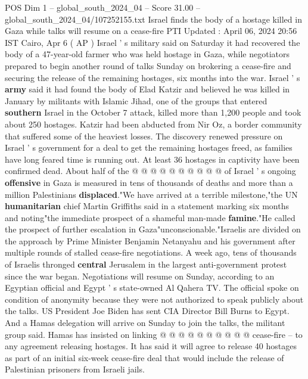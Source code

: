 \begin{textsample}{POS Dim 1 – global\_south\_2024\_04 – Score 31.00 – global\_south\_2024\_04/107252155.txt}  \label{ex:f1_pos_147}
Israel finds the body of a hostage killed in Gaza while talks will resume on a cease-fire PTI Updated : April 06, 2024 20:56 IST Cairo, Apr 6 ( AP ) Israel ' s military said on Saturday it had recovered the body of a 47-year-old farmer who was held hostage in Gaza, while negotiators prepared to begin another round of talks Sunday on brokering a cease-fire and securing the release of the remaining hostages, six months into the war.
Israel ' s \textbf{army} said it had found the body of Elad Katzir and believed he was killed in January by militants with Islamic Jihad, one of the groups that entered \textbf{southern} Israel in the October 7 attack, killed more than 1,200 people and took about 250 hostages.
Katzir had been abducted from Nir Oz, a border community that suffered some of the heaviest losses.
The discovery renewed pressure on Israel ' s government for a deal to get the remaining hostages freed, as families have long feared time is running out.
At least 36 hostages in captivity have been confirmed dead.
About half of the @ @ @ @ @ @ @ @ @ @ of Israel ' s ongoing \textbf{offensive} in Gaza is measured in tens of thousands of deaths and more than a million Palestinians \textbf{displaced}."We have arrived at a terrible milestone,"the UN \textbf{humanitarian} chief Martin Griffiths said in a statement marking six months and noting"the immediate prospect of a shameful man-made \textbf{famine}."He called the prospect of further escalation in Gaza"unconscionable."Israelis are divided on the approach by Prime Minister Benjamin Netanyahu and his government after multiple rounds of stalled cease-fire negotiations.
A week ago, tens of thousands of Israelis thronged \textbf{central} Jerusalem in the largest anti-government protest since the war began.
Negotiations will resume on Sunday, according to an Egyptian official and Egypt ' s state-owned Al Qahera TV.
The official spoke on condition of anonymity because they were not authorized to speak publicly about the talks.
US President Joe Biden has sent CIA Director Bill Burns to Egypt.
And a Hamas delegation will arrive on Sunday to join the talks, the militant group said.
Hamas has insisted on linking @ @ @ @ @ @ @ @ @ @ cease-fire -- to any agreement releasing hostages.
It has said it will agree to release 40 hostages as part of an initial six-week cease-fire deal that would include the release of Palestinian prisoners from Israeli jails.

\end{textsample}
